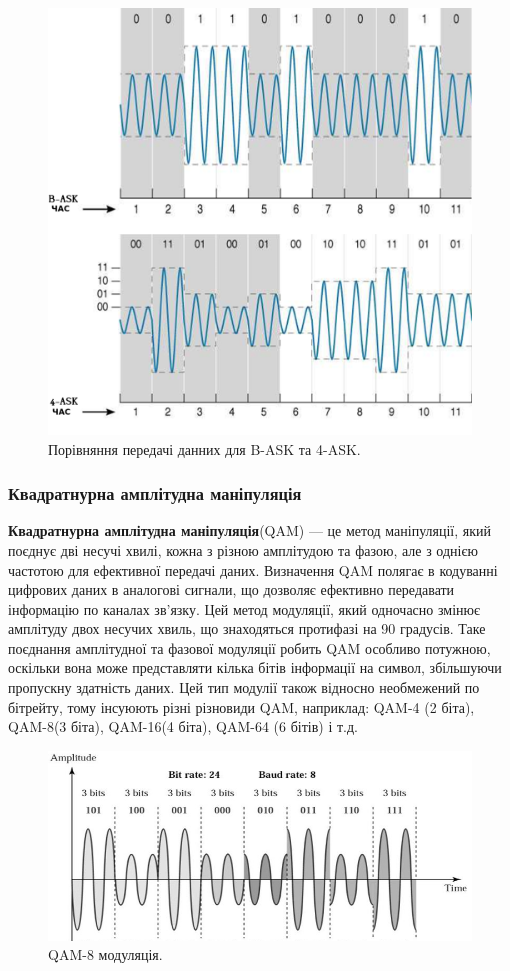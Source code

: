\documentclass{article}
\begin{document}
\begin{figure}[h!]
	\centering
	\includegraphics[width=0.8\linewidth]{images/comparison-bask-vs-4ask.png}
	\caption{\label{fig:comparison-bask-vs-4ask} Порівняння передачі данних для B-ASK та 4-ASK.}
\end{figure}


\newpage
\subsubsection{Квадратнурна амплітудна маніпуляція}
\textbf{Квадратнурна амплітудна маніпуляція}(QAM) --- це метод маніпуляції, який поєднує дві несучі хвилі, кожна з різною амплітудою та фазою, але з однією частотою для ефективної передачі даних. Визначення QAM полягає в кодуванні цифрових даних в аналогові сигнали, що дозволяє ефективно передавати інформацію по каналах зв'язку. Цей метод модуляції, який одночасно змінює амплітуду двох несучих хвиль, що знаходяться протифазі на 90 градусів. Таке поєднання амплітудної та фазової модуляції робить QAM особливо потужною, оскільки вона може представляти кілька бітів інформації на символ, збільшуючи пропускну здатність даних. Цей тип модулії також відносно необмежений по бітрейту, тому інсуюють різні різновиди QAM, наприклад: QAM-4 (2 біта), QAM-8(3 біта), QAM-16(4 біта), QAM-64 (6 бітів) і т.д.

\begin{figure}[h!]
	\centering
	\includegraphics[width=0.8\linewidth]{images/qam.png}
	\caption{\label{fig:qam} QAM-8 модуляція.}
\end{figure}
\end{document}
